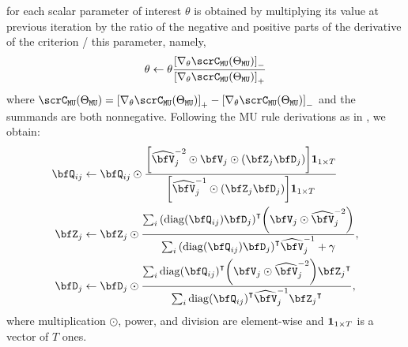  for each scalar parameter of interest $\theta$ is obtained by multiplying its value at previous iteration by the ratio of the negative and positive parts of the derivative of the criterion \wrt/ this parameter, namely,
\begin{equation*}
    \theta \gets \theta \frac{\kbracket{\knabla_\theta \scrC_{\mathtt{MU}}(\Theta_{\mathtt{MU}})}_{-}}
                             {\kbracket{\knabla_\theta \scrC_{\mathtt{MU}}(\Theta_{\mathtt{MU}})}_{+}}
\end{equation*}
where $\scrC_{\mathtt{MU}}(\Theta_{\mathtt{MU}}) = {\kbracket{\knabla_\theta \scrC_{\mathtt{MU}}(\Theta_{\mathtt{MU}})}_{+}} - {\kbracket{\knabla_\theta \scrC_{\mathtt{MU}}(\Theta_{\mathtt{MU}})}_{-}}$ and the summands are both nonnegative.
Following the \ac{MU} rule derivations as in \citeauthor{ozerov2010multichannel}, we obtain:
\begin{align}
    \vQ_{\idxMicSrc} &\gets\vQ_{\idxMicSrc} \odot \frac{\kbracket{\wh{\mV}_\idxSrc^{-2} \odot \mV_\idxSrc \odot \kparen{\mZ_\idxSrc \mD_\idxSrc}}\onesVect_{1\times T}}{
                                            \kbracket{\wh{\mV}_\idxSrc^{-1} \odot \kparen{\mZ_\idxSrc \mD_\idxSrc}}\onesVect_{1\times T}}\\
    \mZ_\idxSrc &\gets \mZ_\idxSrc \odot \frac{\sum_\idxMic \ktranspose{(\diag(\vQ_{\idxMicSrc}) \mD_\idxSrc)} \kparen{\mV_\idxSrc \odot \wh{\mV}_\idxSrc^{-2}}}{
                                            \sum_\idxMic \ktranspose{(\diag(\vQ_{\idxMicSrc}) \mD_\idxSrc)} \wh{\mV}_\idxSrc^{-1} + \gamma},\\
    \mD_\idxSrc &\gets \mD_\idxSrc \odot \frac{\sum_\idxMic \ktranspose{ \diag(\vQ_{\idxMicSrc})} \kparen{\mV_\idxSrc \odot \wh{\mV}_\idxSrc^{-2}}\ktranspose{\mZ_\idxSrc}}{
                                            \sum_\idxMic \ktranspose{ \diag(\vQ_{\idxMicSrc})} \wh{\mV}_\idxSrc^{-1} \ktranspose{\mZ_\idxSrc}},
\end{align}
where multiplication $\odot$, power, and division are element-wise and $\mathbf{1}_{1\times T}$ is a vector of $T$ ones.

